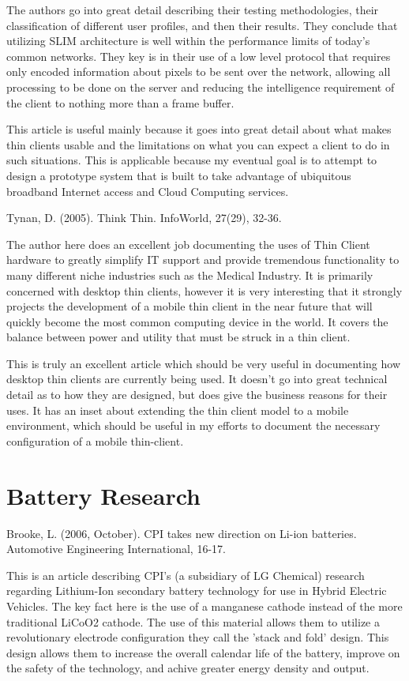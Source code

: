 \documentclass[12pt,oneside,letterpaper,titlepage]{article}
\begin{document}
The authors go into great detail describing their testing methodologies, their
classification of different user profiles, and then their results.  They
conclude that utilizing SLIM architecture is well within the performance limits
of today's common networks.  They key is in their use of a low level protocol
that requires only encoded information about pixels to be sent over the network,
allowing all processing to be done on the server and reducing the intelligence
requirement of the client to nothing more than a frame buffer.

This article is useful mainly because it goes into great detail about what makes
thin clients usable and the limitations on what you can expect a client to do in
such situations.  This is applicable because my eventual goal is to attempt to
design a prototype system that is built to take advantage of ubiquitous
broadband Internet access and Cloud Computing services.

Tynan, D. (2005). Think Thin. InfoWorld, 27(29), 32-36.

The author here does an excellent job documenting the uses of Thin Client
hardware to greatly simplify IT support and provide tremendous functionality to
many different niche industries such as the Medical Industry. It is primarily
concerned with desktop thin clients, however it is very interesting that it
strongly projects the development of a mobile thin client in the near future
that will quickly become the most common computing device in the world. It
covers the balance between power and utility that must be struck in a thin
client.

This is truly an excellent article which should be very useful in documenting
how desktop thin clients are currently being used. It doesn't go into great
technical detail as to how they are designed, but does give the business reasons
for their uses. It has an inset about extending the thin client model to a
mobile environment, which should be useful in my efforts to document the
necessary configuration of a mobile thin-client.

\section{Battery Research}

Brooke, L. (2006, October). CPI takes new direction on Li-ion batteries. Automotive Engineering International, 16-17.

This is an article describing CPI's (a subsidiary of LG Chemical) research
regarding Lithium-Ion secondary battery technology for use in Hybrid Electric
Vehicles.  The key fact here is the use of a manganese cathode instead of the
more traditional LiCoO2 cathode.  The use of this material allows them to
utilize a revolutionary electrode configuration they call the 'stack and fold'
design.  This design allows them to increase the overall calendar life of the
battery, improve on the safety of the technology, and achive greater energy
density and output.
\end{document}
